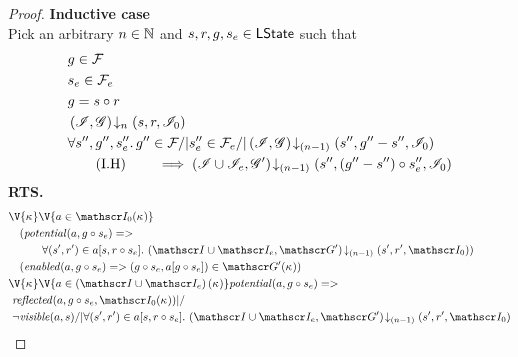 \begin{lemma}
\begin{proof}
\noindent\textbf{Inductive case }\\
Pick an arbitrary $n \in \mathbb{N}$ and $s, r, g, s_e \in \textsf{LState}$ such that
%
\begin{align}
	& g \in \mathcal{F}_{} \label{LEC2:Ass1}\\
	& s_e \in \mathcal{F}_{e} \label{LEC2:Ass2}\\
	& g = s \circ r \label{LEC2:Ass3} \\
	& \left(\mathscr{I}, \mathscr{G}\right) \!\downarrow_{n} \left(s, r, \mathscr{I}_0\right) \label{LEC2:Ass4}\\
	& \forall s'', g'', s_e''.\,  g'' \in \mathcal{F}_{} /| s''_e \in \mathcal{F}_{e} /| \left(\mathscr{I}, \mathscr{G}\right) \!\downarrow_{(n-1)} \left(s'', g''-s'', \mathscr{I}_0\right) \nonumber \\
	& \tag{I.H} \qquad \implies \left(\mathscr{I} \cup \mathscr{I}_{e}, \mathscr{G}'\right) \!\downarrow_{(n-1)} \left(s'', (g''-s'') \circ s_e'', \mathscr{I}_{0}\right) \label{LEC2:IH}
\end{align}
%
\textbf{RTS.}
%
\begin{align}
	& 
	\V{\ca{}}  \V{a\in \lmod_0(\ca{})} \nonumber \\
  &\quad (\m{potential}(a, g \composeL s_e) => \nonumber\\
  & \quad\qquad\for{(s', r') \in a[s, r \composeL s_e]} \extendsAMUpto{\lmod \cup \lmod_e, \gmod'}{(n-1)}{s'}{r'}{\lmod_0}) \label{LEC2:Goal1}\\
%   
  &\quad (\m{enabled}(a,g \composeL s_e)
  => (g \composeL s_e, a[g \composeL s_e])\in \gmod'(\ca{})) \label{LEC2:Goal2}\\
%  
  &\V{\ca{}}\V{a\in \left(\lmod \cup \lmod_e \right) (\ca{})}
  \m{potential}(a,g \composeL s_e) =>\null \nonumber \\
  &\ \m{reflected}(a, g \composeL s_e, \lmod_0(\ca{})) |/\null \nonumber \\
%  
  &\ \neg\m{visible}(a, s) /| \for{(s', r') \in a[s, r \composeL s_e]} \extendsAMUpto{\lmod \cup \lmod_e, \gmod'}{(n-1)}{s'}{r'}{\lmod_0}  \label{LEC2:Goal3}
\end{align}
%
%


\end{proof}
\end{lemma}
